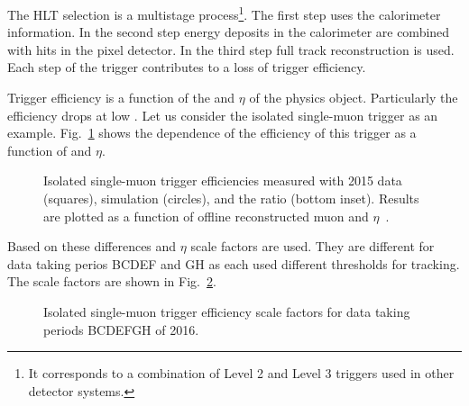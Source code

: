 \begin{description}
The HLT selection is a multistage process\footnote{It corresponds to a combination of Level 2 and Level 3 triggers used in other detector systems.}. The first step uses the calorimeter information. In the second step energy deposits in the calorimeter are combined with hits in the pixel detector. In the third step full track reconstruction is used. Each step of the trigger contributes to a loss of trigger efficiency.

Trigger efficiency is a function of the \pt and $\eta$ of the physics object. Particularly the efficiency drops at low \pt. Let us consider the isolated single-muon trigger as an example. Fig.~\ref{fig:CMS-MUO-16-001_Figure_008} shows the dependence of the efficiency of this trigger as a function of \pt and $\eta$.

\begin{figure}[htp]
\centering
  \def\twidth{0.45}
  \centering
  \hfil
\caption{Isolated single-muon trigger efficiencies measured with 2015 data (squares), simulation (circles), and the ratio (bottom inset). Results are plotted as a function of offline reconstructed muon \pt and $\eta$~\cite{Sirunyan:2018fpa}.}
\label{fig:CMS-MUO-16-001_Figure_008}
\end{figure}

Based on these differences \pt and $\eta$ scale factors are used. They are different for data taking perios BCDEF and GH as each used different thresholds for tracking. The scale factors are shown in Fig.~\ref{fig:muontriggerssf}.

\begin{figure}[htp]
\centering
  \def\twidth{0.45}
  \centering
  \hfil
\caption{Isolated single-muon trigger efficiency scale factors for data taking periods BCDEFGH of 2016.}
\label{fig:muontriggerssf}
\end{figure}


\end{description}
